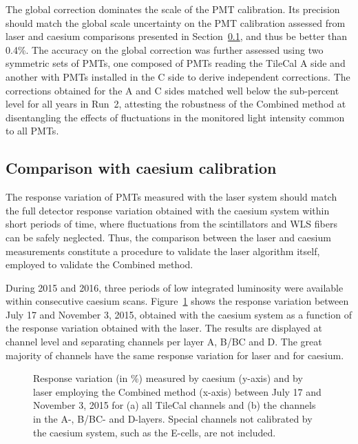 The global correction dominates the scale of the PMT calibration. Its precision should match the global scale uncertainty on the PMT calibration assessed from laser and caesium comparisons presented in Section~\ref{sec:CsLas}, and thus be better than 0.4\%. The accuracy on the global correction was further assessed using two symmetric sets of PMTs, one composed of PMTs reading the TileCal A side and another with PMTs installed in the C side to derive independent corrections. The corrections obtained for the A and C sides matched well below the sub-percent level for all years in Run~2, attesting the robustness of the Combined method at disentangling the effects of fluctuations in the monitored light intensity common to all PMTs.


\subsection{Comparison with caesium calibration}
\label{sec:CsLas}

The response variation of PMTs measured with the laser system should match the full detector response variation obtained with the caesium system within short periods of time, where fluctuations from the scintillators and WLS fibers can be safely neglected. Thus, the comparison between the laser and caesium measurements constitute a procedure to validate the laser algorithm itself, employed to validate the Combined method.

During 2015 and 2016, three periods of low integrated luminosity were available within consecutive caesium scans. Figure~\ref{fig:CsLas2015Nov} shows the response variation between July 17 and November 3, 2015, obtained with the caesium system as a function of the response variation obtained with the laser. The results are displayed at channel level and separating channels per layer A, B/BC and D. The great majority of channels have the same response variation for laser and for caesium.

\begin{figure}[htbp]
\centering
{}
\caption{Response variation (in \%) measured by caesium (y-axis) and by laser employing the Combined method (x-axis) between July 17 and November 3, 2015 for (a) all TileCal channels and (b) the channels in the A-, B/BC- and D-layers. Special channels not calibrated by the caesium system, such as the E-cells, are not included.
}
\label{fig:CsLas2015Nov}
\end{figure}

